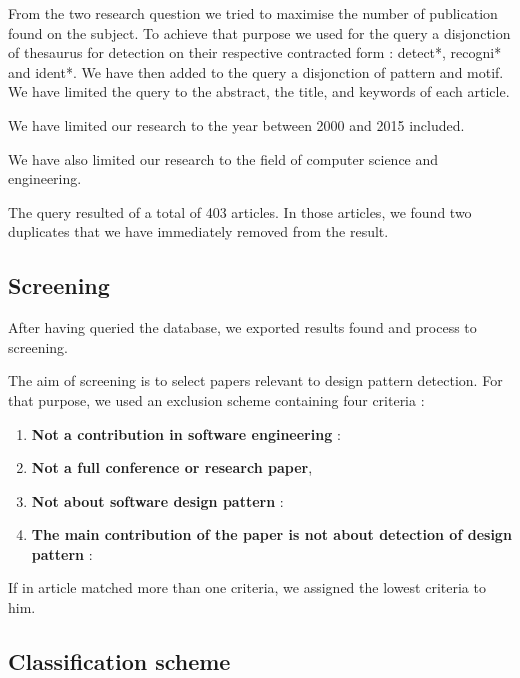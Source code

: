 \documentclass[letterpaper, 10 pt, conference]{ieeeconf}  %
\begin{document}
From the two research question we tried to maximise the number of publication found on the subject. To achieve that purpose we used for the query a disjonction of thesaurus for detection on their respective contracted form : detect*, recogni* and ident*. We have then added to the query a disjonction of pattern and motif.
We have limited the query to the abstract, the title, and keywords of each article.

We have limited our research to the year between 2000 and 2015 included. 

We have also limited our research to the field of computer science and engineering.

The query resulted of a total of 403 articles. In those articles, we found two duplicates that we have immediately removed from the result.

\subsection{Screening}

After having queried the database, we exported results found and process to screening. 


The aim of screening is to select papers relevant to design pattern detection. For that purpose, we used an exclusion scheme containing four criteria :

\begin{enumerate}
	\item \textbf{Not a contribution in software engineering} : %
	\item \textbf{Not a full conference or research paper},
	\item \textbf{Not about software design pattern} : %
	\item \textbf{The main contribution of the paper is not about detection of design pattern} : %
\end{enumerate}

If in article matched more than one criteria, we assigned the lowest criteria to him.


\subsection{Classification scheme}

\end{document}

